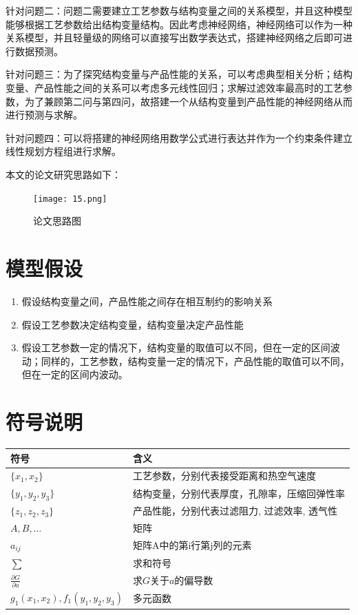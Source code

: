 \documentclass[withoutpreface,bwprint]{cumcmthesis} %
\begin{document}
   
   针对问题二：问题二需要建立工艺参数与结构变量之间的关系模型，并且这种模型能够根据工艺参数给出结构变量结构。因此考虑神经网络，神经网络可以作为一种关系模型，并且轻量级的网络可以直接写出数学表达式，搭建神经网络之后即可进行数据预测。
   
   针对问题三：为了探究结构变量与产品性能的关系，可以考虑典型相关分析；结构变量、产品性能之间的关系可以考虑多元线性回归；求解过滤效率最高时的工艺参数，为了兼顾第二问与第四问，故搭建一个从结构变量到产品性能的神经网络从而进行预测与求解。
   
   
   针对问题四：可以将搭建的神经网络用数学公式进行表达并作为一个约束条件建立线性规划方程组进行求解。
   
   本文的论文研究思路如下：
   \begin{figure}[H]
   	\centering
   	\texttt{[image: 15.png]}
   	\caption{论文思路图}
   	\label{2}
   \end{figure}
   
		
\section{模型假设}
\begin{enumerate}
	\item 假设结构变量之间，产品性能之间存在相互制约的影响关系
	\item 假设工艺参数决定结构变量，结构变量决定产品性能
	\item 假设工艺参数一定的情况下，结构变量的取值可以不同，但在一定的区间波动；同样的，工艺参数，结构变量一定的情况下，产品性能的取值可以不同，但在一定的区间内波动。
\end{enumerate}

\clearpage
\section{符号说明}
\begin{table}[h]
	\begin{center}
		\begin{tabular}{p{200pt}p{280pt}}
			\toprule
			符号    & 含义  \\
			\midrule
			$\{x_1,x_2\}$&工艺参数，分别代表接受距离和热空气速度 \\
			$\{y_1,y_2,y_3\}$&结构变量，分别代表厚度，孔隙率，压缩回弹性率 \\
			$\{z_1,z_2,z_3\}$&产品性能，分别代表过滤阻力, 过滤效率, 透气性 \\
			$A,B,\dots$     &   矩阵 \\
			$a_{ij}$ & 矩阵A中的第i行第j列的元素   \\	
			$\sum$  &  求和符号 \\
			$\frac{\partial G}{\partial a}$  &  求$G$关于$a$的偏导数    \\	
			$ g_1 (x_1 ,x_2 ),f_1 (y_1 ,y_2 ,y_3 )$    &   多元函数   \\
			
			
			
			
			\bottomrule
		\end{tabular}
	\end{center}
\end{table}
\end{document}
